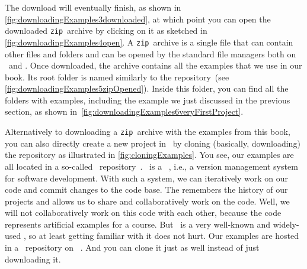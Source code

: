 %
The download will eventually finish, as shown in \cref{fig:downloadingExamples3downloaded}, at which point you can open the downloaded \texttt{zip}~archive by clicking on it as sketched in \cref{fig:downloadingExamples4open}.
A \texttt{zip}~archive is a single file that can contain other files and folders and can be opened by the standard file managers both on \ubuntu\ and \microsoftWindows.
Once downloaded, the archive contains all the examples that we use in our book.
Its root folder is named similarly to the repository~(see \cref{fig:downloadingExamples5zipOpened}).
Inside this folder, you can find all the folders with examples, including the example  we just discussed in the previous section, as shown in~\cref{fig:downloadingExamples6veryFirstProject}.

Alternatively to downloading a \texttt{zip}~archive with the examples from this book, you can also directly create a new project in \pycharm\ by cloning (basically, downloading) the repository as illustrated in \cref{fig:cloningExamples}.
You see, our examples are all located in a so-called \git\ repository~\cite{S2023LG,T2024BGAGVCPMATFTND}.
\git\ is a ~\cite{S2023LG,T2024BGAGVCPMATFTND}, i.e., a version management system for software development.
With such a system, we can iteratively work on our code and commit changes to the code base.
The  remembers the history of our projects and allows us to share and collaboratively work on the code.
Well, we will not collaboratively work on this code with each other, because the code represents artificial examples for a course.
But \git\ is a very well-known and widely-used , so at least getting familiar with it does not hurt.
Our examples are hosted in a \git\ repository on \github~\cite{PRGWSUdVLFTEKPKFBV2016TSRFTAOGAG,T2024BGAGVCPMATFTND}.
And you can clone it just as well instead of just downloading it.

